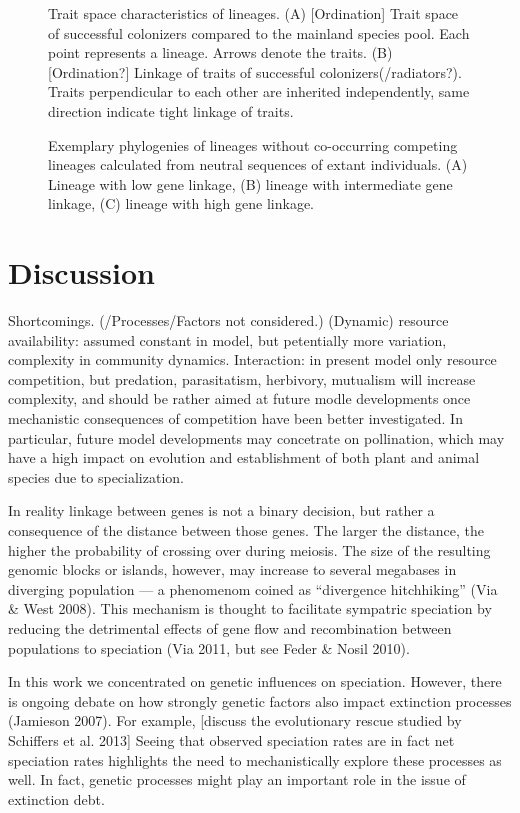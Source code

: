 \documentclass[a4paper]{scrartcl}
\begin{document}
\begin{figure}
  \caption{Trait space characteristics of lineages.
    (A) [Ordination] Trait space of successful colonizers compared to the mainland species pool. Each point represents a lineage.
    Arrows denote the traits.
    (B) [Ordination?] Linkage of traits of successful colonizers(/radiators?). Traits perpendicular to each other are inherited independently,
  same direction indicate tight linkage of traits.}
  \label{traitspace}
\end{figure}

\begin{figure}
  \caption{Exemplary phylogenies of lineages without co-occurring competing lineages calculated from neutral sequences of
    extant individuals.
    (A) Lineage with low gene linkage,
    (B) lineage with intermediate gene linkage,
    (C) lineage with high gene linkage.}
  \label{phylogenies}
\end{figure}

\section{Discussion}

Shortcomings. (/Processes/Factors not considered.)
(Dynamic) resource availability: assumed constant in model, but petentially more variation, complexity in community dynamics.
Interaction: in present model only resource competition, %
but predation, parasitatism, herbivory, mutualism will increase complexity,
and should be rather aimed at future modle developments once mechanistic consequences of competition have been better investigated.
In particular, future model developments may concetrate on pollination,
which may have a high impact on evolution and establishment of both plant and animal species due to specialization. %

In reality linkage between genes is not a binary decision, but rather a consequence of the distance between those genes.
The larger the distance, the higher the probability of crossing over during meiosis.
The size of the resulting genomic blocks or islands, however, may increase to several megabases in diverging population ---
a phenomenom coined as ``divergence hitchhiking'' (Via \& West 2008). %
This mechanism is thought to facilitate sympatric speciation by reducing the detrimental effects of gene flow and
recombination between populations to speciation (Via 2011, but see Feder \& Nosil 2010).

In this work we concentrated on genetic influences on speciation.
However, there is ongoing debate on how strongly genetic factors also impact extinction processes (Jamieson 2007).
For example, [discuss the evolutionary rescue studied by Schiffers et al. 2013]
Seeing that observed speciation rates are in fact net speciation rates highlights the need to mechanistically explore
these processes as well.
In fact, genetic processes might play an important role in the issue of extinction debt. %

\printbibliography
\end{document}
